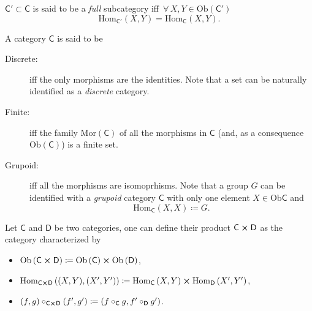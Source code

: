 \begin{defn}
	$\mathsf{C}' \subset \mathsf{C}$ is said to be a {\em full} subcategory iff $\,\forall\, X, Y \in \mathrm{Ob}(\mathsf{C}')$ 
	\begin{equation}
	\mathrm{Hom}_{\mathsf{C}'} \left( X, Y \right) = \mathrm{Hom}_{\mathsf{C}} \left( X, Y \right)
	.\end{equation} 
\end{defn}

\begin{defn}
	A category $\mathsf{C}$ is said to be
	\begin{description}
		\item[Discrete:] iff the only morphisms are the identities.
			Note that a set can be naturally identified as a {\em discrete} category.
		\item[Finite:] iff the family $\mathrm{Mor}(\mathsf{C})$ of all the morphisms in $\mathsf{C}$ (and, as a consequence $\mathrm{Ob}(\mathsf{C})$) is a finite set.
		\item[Grupoid:] iff all the morphisms are isomoprhisms.
			Note that a group $G$ can be identified with a {\em grupoid} category $\mathsf{C}$ with only one element $X \in \mathrm{Ob}\mathsf{C}$ and
			\begin{equation}
				\mathrm{Hom}_{\mathsf{C}} \left( X, X \right) \coloneqq G
			.\end{equation} 
	\end{description} 
\end{defn}

\begin{defn}
	Let $\mathsf{C}$ and $\mathsf{D}$ be two categories, one can define their product $\mathsf{C}\cross \mathsf{D}$ as the category characterized by
	\begin{itemize}
		\item $\mathrm{Ob} \left(\mathsf{C}\cross \mathsf{D}\right) \coloneqq \mathrm{Ob} \left(\mathsf{C}\right) \cross \mathrm{Ob} \left(\mathsf{D}\right)$,
		\item $\mathrm{Hom}_{\mathsf{C}\cross \mathsf{D}} \left( (X,Y), (X',Y') \right) \coloneqq \mathrm{Hom}_{\mathsf{C}} \left( X, Y \right) \cross \mathrm{Hom}_{\mathsf{D}} \left( X', Y' \right)$,
		\item $\left(f, g\right)\circ_{\mathsf{C}\cross \mathsf{D}}\left(f', g'\right) \coloneqq \left(f \circ_{\mathsf{C}}g, f' \circ_{\mathsf{D}} g' \right)$.
	\end{itemize} 
\end{defn}

